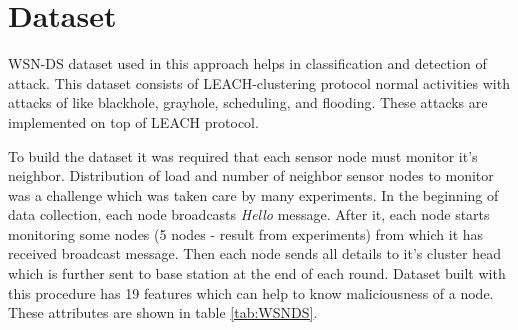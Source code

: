 \section{Dataset} \label{S5.3}
WSN-DS\cite{almomani2016wsn} dataset used in this approach helps in classification and detection of attack. This dataset consists of LEACH-clustering protocol normal activities with attacks of like blackhole, grayhole, scheduling, and flooding. These attacks are implemented on top of LEACH protocol.
\par
To build the dataset it was required that each sensor node must monitor it's neighbor. Distribution of load and number of neighbor sensor nodes to monitor was a challenge which was taken care by many experiments. In the beginning of data collection, each node broadcasts \textit{Hello} message. After it, each node starts monitoring some nodes (5 nodes - result from experiments) from which it has received broadcast message. Then each node sends all details to it's cluster head which is further sent to base station at the end of each round. Dataset built with this procedure has 19 features which can help to know maliciousness of a node. These attributes are shown in table \ref{tab:WSNDS}.
